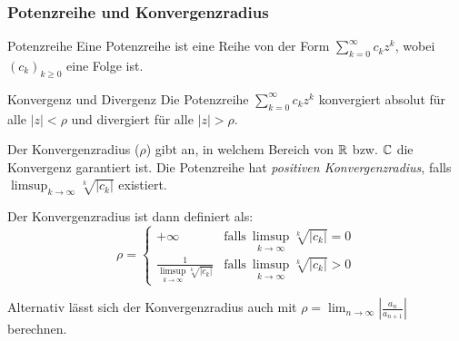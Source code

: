 \subsubsection{Potenzreihe und Konvergenzradius}

\begin{definition}{Potenzreihe}
    Eine Potenzreihe ist eine Reihe von der Form $\sum_{k=0}^\infty c_k z^k$, wobei $(c_k)_{k\geq 0}$ eine Folge ist.
\end{definition}

\begin{corollary}{Konvergenz und Divergenz}
    Die Potenzreihe $\sum_{k=0}^\infty c_k z^k$ konvergiert absolut für alle $|z| < \rho$ und divergiert für alle $|z| > \rho$.
\end{corollary}

Der Konvergenzradius ($\rho$) gibt an, in welchem Bereich von $\mathbb{R}$ bzw. $\mathbb{C}$ die Konvergenz garantiert ist. Die Potenzreihe hat \emph{positiven Konvergenzradius}, falls $\limsup_{k \to \infty} \sqrt[k]{|c_k|}$ existiert.

Der Konvergenzradius ist dann definiert als:
\begin{equation*}
    \rho = \begin{cases}
        + \infty & \text{falls}~\limsup_{k \to \infty} \sqrt[k]{|c_k|} = 0\\
        \frac{1}{\limsup_{k \to \infty} \sqrt[k]{|c_k|}} & \text{falls}~\limsup_{k \to \infty} \sqrt[k]{|c_k|} > 0
    \end{cases}
\end{equation*}

Alternativ lässt sich der Konvergenzradius auch mit $\rho = \lim_{n \to \infty} \left| \frac{a_n}{a_{n+1}} \right|$ berechnen.
